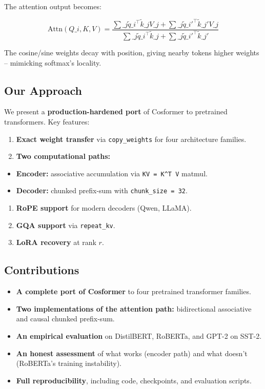 The attention output becomes:

\[
\text{Attn}(Q\_i, K, V) = \frac{\sum\_j \tilde{q}\_i^\top \tilde{k}\_j V\_j + \sum\_j \tilde{q}\_i'^\top \tilde{k}\_j' V\_j}{\sum\_j \tilde{q}\_i^\top \tilde{k}\_j + \sum\_j \tilde{q}\_i'^\top \tilde{k}\_j'}
\]

The cosine/sine weights decay with position, giving nearby tokens higher 
weights -- mimicking softmax's locality.

\subsection{Our Approach}

We present a \textbf{production-hardened port} of Cosformer to pretrained 
transformers. Key features:

\begin{enumerate}
\item \textbf{Exact weight transfer} via \texttt{copy\_weights} for four architecture families.
\item \textbf{Two computational paths:}
\end{enumerate}
\begin{itemize}
\item \textbf{Encoder:} associative accumulation via \texttt{KV = K^T V} matmul.
\item \textbf{Decoder:} chunked prefix-sum with \texttt{chunk\_size = 32}.
\end{itemize}
\begin{enumerate}
\item \textbf{RoPE support} for modern decoders (Qwen, LLaMA).
\item \textbf{GQA support} via \texttt{repeat\_kv}.
\item \textbf{LoRA recovery} at rank $r$.

\end{enumerate}
\subsection{Contributions}

\begin{itemize}
\item \textbf{A complete port of Cosformer} to four pretrained transformer families.
\item \textbf{Two implementations of the attention path:} bidirectional associative
  and causal chunked prefix-sum.
\item \textbf{An empirical evaluation} on DistilBERT, RoBERTa, and GPT-2 on SST-2.
\item \textbf{An honest assessment} of what works (encoder path) and what doesn't
  (RoBERTa's training instability).
\item \textbf{Full reproducibility}, including code, checkpoints, and evaluation scripts.

\end{itemize}

